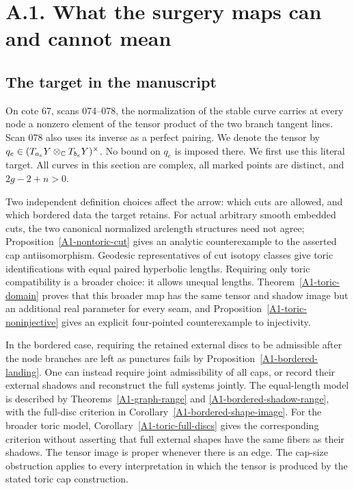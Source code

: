 \section{A.1. What the surgery maps can and cannot mean}
\subsection{The target in the manuscript}
On cote 67, scans 074--078, the normalization of the stable curve carries at every node a nonzero element of the tensor product of the two branch tangent lines. Scan 078 also uses its inverse as a perfect pairing. We denote the tensor by $q_e\in(T_{a_e}Y\otimes_{{\mathbb{C}}}T_{b_e}Y)^\times$. No bound on $q_e$ is imposed there. We first use this literal target. All curves in this section are complex, all marked points are distinct, and $2g-2+n>0$.

Two independent definition choices affect the arrow: which cuts are
allowed, and which bordered data the target retains. For actual
arbitrary smooth embedded cuts, the two canonical normalized
arclength structures need not agree;
Proposition~\ref{A1-nontoric-cut} gives an analytic counterexample
to the asserted cap antiisomorphism. Geodesic representatives of
cut isotopy classes give toric identifications with equal paired
hyperbolic lengths. Requiring only toric compatibility is a broader
choice: it allows unequal lengths. Theorem~\ref{A1-toric-domain}
proves that this broader map has the same tensor and shadow image
but an additional real parameter for every seam, and
Proposition~\ref{A1-toric-noninjective} gives an explicit
four-pointed counterexample to injectivity.

In the bordered case, requiring the retained external discs to be
admissible after the node branches are left as punctures fails by
Proposition~\ref{A1-bordered-landing}. One can instead require
joint admissibility of all caps, or record their external shadows
and reconstruct the full systems jointly. The equal-length model
is described by Theorems~\ref{A1-graph-range} and
\ref{A1-bordered-shadow-range}, with the full-disc criterion in
Corollary~\ref{A1-bordered-shape-image}. For the broader toric
model, Corollary~\ref{A1-toric-full-discs} gives the corresponding
criterion without asserting that full external shapes have the
same fibers as their shadows. The tensor image is proper whenever
there is an edge. The cap-size obstruction applies to every
interpretation in which the tensor is produced by the stated
toric cap construction.

